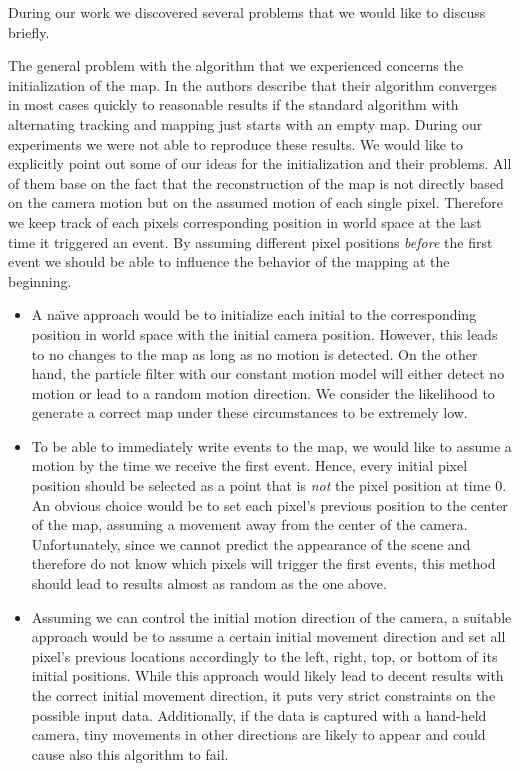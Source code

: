 During our work we discovered several problems that we would like to discuss briefly.

The general problem with the algorithm that we experienced concerns the
initialization of the map.
In \cite{kim2014simultaneous} the authors describe that their algorithm converges
in most cases quickly to reasonable results if the standard algorithm with
alternating tracking and mapping just starts with an empty map.
During our experiments we were not able to reproduce these results.
We would like to explicitly point out some of our ideas for the initialization
and their problems. All of them base on the fact that the reconstruction of the
map is not directly based on the camera motion but on the assumed motion of each
single pixel. Therefore we keep track of each pixels corresponding position in world
space at the last time it triggered an event. By assuming different pixel positions
\textit{before} the first event we should be able to influence the behavior of the
mapping at the beginning.

\begin{itemize}
\item
A na\"{\i}ve approach would be to initialize each initial to the corresponding position in
world space with the initial camera position. However, this leads to no changes to the map
as long as no motion is detected. On the other hand, the particle filter with our constant
motion model will either detect no motion or lead to a random motion direction. We consider
the likelihood to generate a correct map under these circumstances to be extremely low.

\item
To be able to immediately write events to the map, we would like to assume a motion
by the time we receive the first event. Hence, every initial pixel position should be
selected as a point that is \textit{not} the pixel position at time 0.
An obvious choice would be to set each pixel's previous position to the center of the
map, assuming a movement away from the center of the camera.
Unfortunately, since we cannot predict the appearance of the scene and therefore do not
know which pixels will trigger the first events, this method should lead to results
almost as random as the one above.

\item
Assuming we can control the initial motion direction of the camera, a suitable approach
would be to assume a certain initial movement direction and set all pixel's previous locations
accordingly to the left, right, top, or bottom of its initial positions.
While this approach would likely lead to decent results with the correct initial movement direction,
it puts very strict constraints on the possible input data. Additionally, if the data
is captured with a hand-held camera, tiny movements in other directions are likely to appear
and could cause also this algorithm to fail.

\end{itemize}

